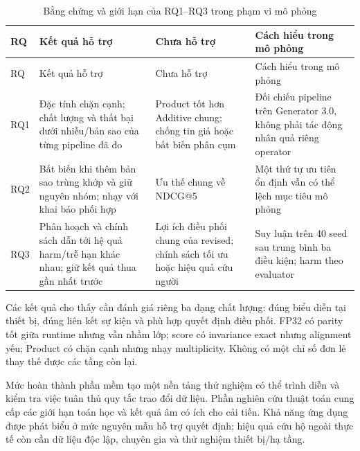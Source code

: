 \begin{longtable}{P{.10\textwidth}P{.27\textwidth}P{.27\textwidth}P{.25\textwidth}}
\caption{Bằng chứng và giới hạn của RQ1--RQ3 trong phạm vi mô phỏng}\label{tab:rq-evidence-boundaries}\\
\toprule RQ & Kết quả hỗ trợ & Chưa hỗ trợ & Cách hiểu trong mô phỏng \\\midrule\endfirsthead
\toprule RQ & Kết quả hỗ trợ & Chưa hỗ trợ & Cách hiểu trong mô phỏng \\\midrule\endhead
RQ1 & Đặc tính chặn cạnh; chất lượng và thất bại dưới nhiễu/bản sao của từng pipeline đã đo & Product tốt hơn Additive chung; chống tin giả hoặc bất biến phân cụm & Đối chiếu pipeline trên Generator 3.0, không phải tác động nhân quả riêng operator \\
RQ2 & Bất biến khi thêm bản sao trùng khớp và giữ nguyên nhóm; nhạy với khai báo phối hợp & Ưu thế chung về NDCG@5 & Một thứ tự ưu tiên ổn định vẫn có thể lệch mục tiêu mô phỏng \\
RQ3 & Phân hoạch và chính sách dẫn tới hệ quả harm/trễ hạn khác nhau; giữ kết quả thua gần nhất trước & Lợi ích điều phối chung của revised; chính sách tối ưu hoặc hiệu quả cứu người & Suy luận trên 40 seed sau trung bình ba điều kiện; harm theo evaluator \\
\bottomrule
\end{longtable}

Các kết quả cho thấy cần đánh giá riêng ba dạng chất lượng: đúng biểu diễn tại thiết bị, đúng liên kết sự kiện và phù hợp quyết định điều phối. FP32 có parity tốt giữa runtime nhưng vẫn nhầm lớp; score có invariance exact nhưng alignment yếu; Product có chặn cạnh nhưng nhạy multiplicity. Không có một chỉ số đơn lẻ thay thế được các tầng còn lại.

Mức hoàn thành phần mềm tạo một nền tảng thử nghiệm có thể trình diễn và kiểm tra việc tuân thủ quy tắc trao đổi dữ liệu. Phần nghiên cứu thuật toán cung cấp các giới hạn toán học và kết quả âm có ích cho cải tiến. Khả năng ứng dụng được phát biểu ở mức nguyên mẫu hỗ trợ quyết định; hiệu quả cứu hộ ngoài thực tế còn cần dữ liệu độc lập, chuyên gia và thử nghiệm thiết bị/hạ tầng.
